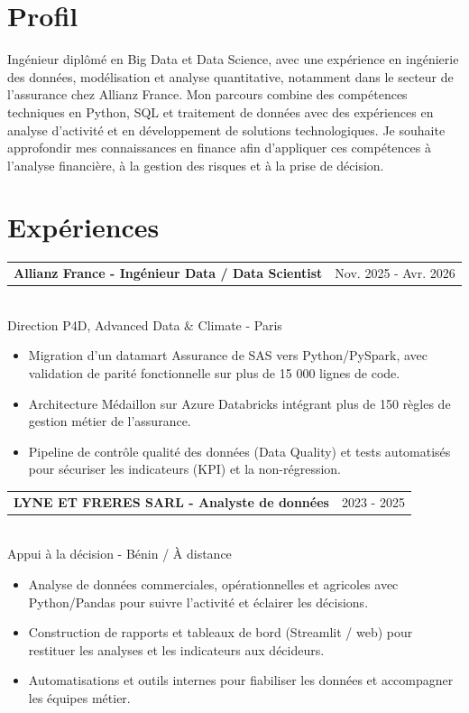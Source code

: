 \documentclass[10pt,a4paper]{article}
\makeatletter
\newcommand{\role}[3]{%
  \vspace{3pt}
  \begin{tabularx}{\linewidth}{@{}Xr@{}}
  \textbf{#1} & {\color{muted}#2}
  \end{tabularx}\vspace{0.8pt}\\
  {\color{muted}#3}\par
  \vspace{3pt}
}
\makeatother
\begin{document}
\begin{lrbox}{\maincolumnbox}
\begin{minipage}[t]{0.695\textwidth}
\vspace{0pt}
\raggedright

\section{Profil}
Ingénieur diplômé en Big Data et Data Science, avec une expérience en ingénierie des données, modélisation et analyse quantitative, notamment dans le secteur de l'assurance chez Allianz France. Mon parcours combine des compétences techniques en Python, SQL et traitement de données avec des expériences en analyse d'activité et en développement de solutions technologiques. Je souhaite approfondir mes connaissances en finance afin d'appliquer ces compétences à l'analyse financière, à la gestion des risques et à la prise de décision.

\section{Expériences}
\role{Allianz France - Ingénieur Data / Data Scientist}{Nov. 2025 - Avr. 2026}{Direction P4D, Advanced Data \& Climate - Paris}
\begin{itemize}
  \item Migration d'un datamart Assurance de SAS vers Python/PySpark, avec validation de parité fonctionnelle sur plus de 15 000 lignes de code.
  \item Architecture Médaillon sur Azure Databricks intégrant plus de 150 règles de gestion métier de l'assurance.
  \item Pipeline de contrôle qualité des données (Data Quality) et tests automatisés pour sécuriser les indicateurs (KPI) et la non-régression.
\end{itemize}

\vspace{8pt}
\role{LYNE ET FRERES SARL - Analyste de données}{2023 - 2025}{Appui à la décision - Bénin / À distance}
\begin{itemize}
  \item Analyse de données commerciales, opérationnelles et agricoles avec Python/Pandas pour suivre l'activité et éclairer les décisions.
  \item Construction de rapports et tableaux de bord (Streamlit / web) pour restituer les analyses et les indicateurs aux décideurs.
  \item Automatisations et outils internes pour fiabiliser les données et accompagner les équipes métier.
\end{itemize}


\end{minipage}
\end{lrbox}
\end{document}
